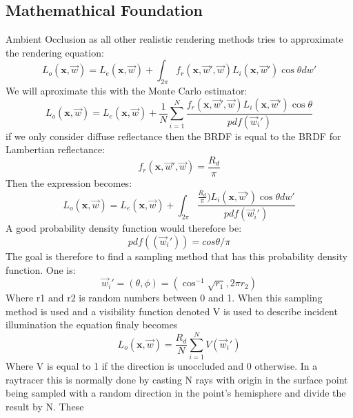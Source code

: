 \subsection{Mathemathical Foundation}
Ambient Occlusion as all other realistic rendering methods tries to approximate the rendering equation:
\[ 
L_o(\textbf{x},\overrightarrow{w}) = 
L_e(\textbf{x},\overrightarrow{w}) +
\int_{2\pi}
 f_r(\textbf{x},\overrightarrow{w}',\overrightarrow{w} )L_i(\textbf{x},\overrightarrow{w}')\cos\theta dw'
\]
We will aproximate this with the Monte Carlo estimator:
\[ 
L_o(\textbf{x},\overrightarrow{w}) = 
L_e(\textbf{x},\overrightarrow{w}) +
\frac{1}{N}
\sum_{i=1}^N \frac{ 
 f_r(\textbf{x},\overrightarrow{w}',\overrightarrow{w} )L_i(\textbf{x},\overrightarrow{w}')\cos\theta
}
{
pdf(\overrightarrow{w}_i')
}
\]
if we only consider diffuse reflectance then the BRDF is equal to the BRDF for Lambertian reflectance:
\[
 f_r(\textbf{x},\overrightarrow{w}',\overrightarrow{w}) = \frac{R_d}{\pi}
\]
Then the expression becomes:
\[ 
L_o(\textbf{x},\overrightarrow{w}) = 
L_e(\textbf{x},\overrightarrow{w}) +
\int_{2\pi} \frac{ 
\frac{R_d}{\pi})L_i(\textbf{x},\overrightarrow{w}')\cos\theta dw'
}
{
pdf(\overrightarrow{w}_i')
}
\]
A good probability density function would therefore be:
\[
pdf((\overrightarrow{w}_i')) = cos\theta / \pi
\]
The goal is therefore to find a sampling method that has this probability density function. One is:
\[
\overrightarrow{w}_i' = (\theta,\phi) =
(\cos^{-1}\sqrt{r_1},2\pi r_2)
\]
Where r1 and r2 is random numbers between 0 and 1.
When this sampling method is used and a visibility function denoted V is used to describe incident illumination the equation finaly becomes
\[ 
L_o(\textbf{x},\overrightarrow{w}) = 
\frac{R_d}{N} \sum_{i=1}^N V(\overrightarrow{w}_i')
\]
Where V is equal to 1 if the direction is unoccluded and 0 otherwise. In a raytracer this is normally done by casting N rays with origin in the surface point being sampled with a random direction in the point's hemisphere and divide the result by N. These
